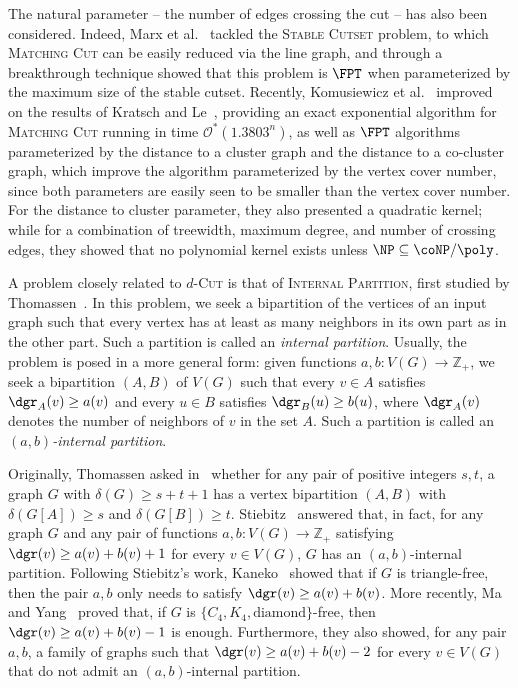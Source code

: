 \documentclass[a4paper,UKenglish,cleveref, autoref]{lipics-v2019}
\newcommand{\ig}[1]{\textcolor{red}{[Ig: #1]}}
\newcommand{\bigOs}[1]{\mathcal{O}^*\!\left(#1\right)}
\newcommand{\pname}[1]{\textsc{#1}}
\newcommand{\tdef}[1]{\emph{#1}}
\begin{document}
The natural parameter -- the number of edges crossing the cut -- has also been considered.
Indeed, Marx et al.~\cite{marx_treewidth_reduction} tackled the \pname{Stable Cutset} problem, to which \textsc{Matching Cut} can be easily reduced via the line graph, and through a breakthrough technique showed that this problem is $\FPT$ when parameterized by the maximum size of the stable cutset.
Recently, Komusiewicz et al.~\cite{matching_cut_ipec} improved on the results of Kratsch and Le~\cite{matching_cut_tcs}, providing an exact exponential algorithm for \textsc{Matching Cut} running in  time $\bigOs{1.3803^n}$, as well as $\FPT$ algorithms parameterized by the distance to a cluster graph and the distance to a co-cluster graph, which improve the algorithm parameterized by the vertex cover number, since both parameters are easily seen to be smaller than the vertex cover number.
For the distance to cluster parameter, they also presented a quadratic kernel; while for a combination of treewidth, maximum degree, and number of crossing edges, they showed that no polynomial kernel exists unless $\NP \subseteq \coNP/\poly$.

A problem  closely related to \pname{$d$-Cut} is that of \pname{Internal Partition}, first studied by Thomassen~\cite{internal_partition_thomassen}.
In this problem, we seek a bipartition of the vertices of an input graph such that every vertex has at least as many neighbors in its
own part as in the other part. Such a partition is called an \tdef{internal partition}.
Usually, the problem is posed in a more general form: given functions $a,b: V(G) \rightarrow \mathbb{Z}_+$, we seek a bipartition $(A,B)$ of $V(G)$ such that every $v \in A$ satisfies $\dgr_A(v) \geq a(v)$ and every $u \in B$ satisfies $\dgr_B(u) \geq b(u)$, where $\dgr_A(v)$ denotes the number of neighbors of $v$ in the set $A$. Such a partition is called an \tdef{$(a,b)$-internal partition}.

Originally, Thomassen asked in~\cite{internal_partition_thomassen} whether for any pair of positive integers $s,t$, a graph $G$ with $\delta(G) \geq s + t + 1$ has a vertex bipartition $(A,B)$ with $\delta(G[A]) \geq s$ and $\delta(G[B]) \geq t$.
Stiebitz~\cite{internal_partition_stiebitz} answered that, in fact, for any graph $G$ and any pair of functions $a,b: V(G) \rightarrow \mathbb{Z}_+$ satisfying $\dgr(v) \geq a(v) + b(v) + 1$ for every $v \in V(G)$, $G$ has an $(a,b)$-internal partition.
Following Stiebitz's work, Kaneko~\cite{internal_partition_triangle_free} showed that if $G$ is triangle-free, then the pair $a,b$ only needs to satisfy $\dgr(v) \geq a(v) + b(v)$.
More recently, Ma and Yang~\cite{internal_partition_c4_free} proved that, if $G$ is $\{C_4, K_4, \text{diamond}\}$-free, then $\dgr(v) \geq a(v) + b(v) - 1$ is enough.
Furthermore, they also showed, for any pair $a,b$, a family of graphs such that $\dgr(v) \geq a(v) + b(v) - 2$ for every $v \in V(G)$ that do not admit an $(a,b)$-internal partition.
\end{document}
